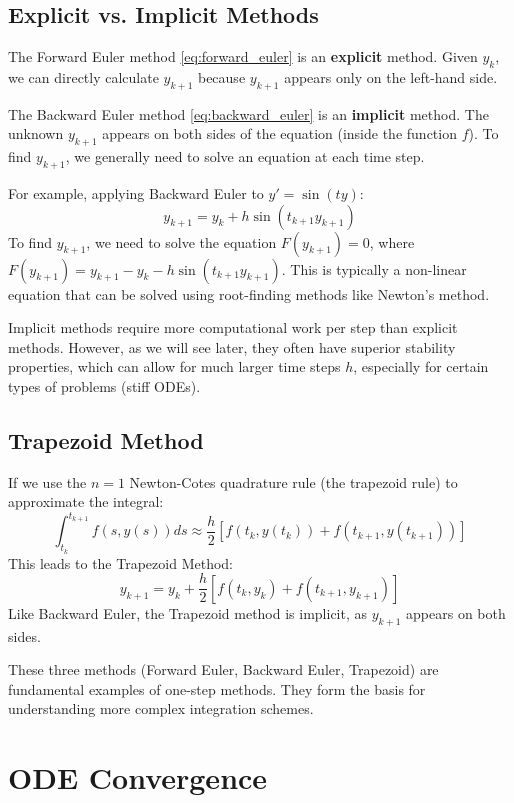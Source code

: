 \documentclass{article}
\begin{document}
\subsection{Explicit vs. Implicit Methods}
The Forward Euler method \eqref{eq:forward_euler} is an \textbf{explicit} method. Given $y_k$, we can directly calculate $y_{k+1}$ because $y_{k+1}$ appears only on the left-hand side.

The Backward Euler method \eqref{eq:backward_euler} is an \textbf{implicit} method. The unknown $y_{k+1}$ appears on both sides of the equation (inside the function $f$). To find $y_{k+1}$, we generally need to solve an equation at each time step.

For example, applying Backward Euler to $y' = \sin(ty)$:
\[
y_{k+1} = y_k + h \sin(t_{k+1} y_{k+1})
\]
To find $y_{k+1}$, we need to solve the equation $F(y_{k+1}) = 0$, where $F(y_{k+1}) = y_{k+1} - y_k - h \sin(t_{k+1} y_{k+1})$. This is typically a non-linear equation that can be solved using root-finding methods like Newton's method.

Implicit methods require more computational work per step than explicit methods. However, as we will see later, they often have superior stability properties, which can allow for much larger time steps $h$, especially for certain types of problems (stiff ODEs).

\subsection{Trapezoid Method}
If we use the $n=1$ Newton-Cotes quadrature rule (the trapezoid rule) to approximate the integral:
\[
\int_{t_k}^{t_{k+1}} f(s, y(s)) ds \approx \frac{h}{2} [f(t_k, y(t_k)) + f(t_{k+1}, y(t_{k+1}))]
\]
This leads to the Trapezoid Method:
\begin{equation} \label{eq:trapezoid}
y_{k+1} = y_k + \frac{h}{2} [f(t_k, y_k) + f(t_{k+1}, y_{k+1})]
\end{equation}
Like Backward Euler, the Trapezoid method is implicit, as $y_{k+1}$ appears on both sides.

These three methods (Forward Euler, Backward Euler, Trapezoid) are fundamental examples of one-step methods. They form the basis for understanding more complex integration schemes.

\section{ODE Convergence}
\end{document}
